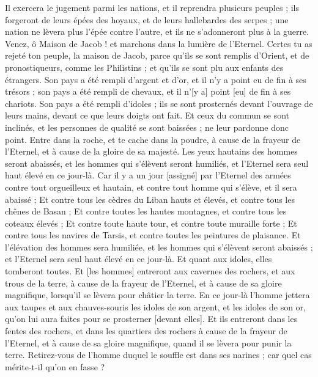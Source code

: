 \begin{multicols}{2}
Il exercera le jugement parmi les nations, et il reprendra plusieurs peuples ; ils forgeront de leurs épées des hoyaux, et de leurs hallebardes des serpes ; une nation ne lèvera plus l'épée contre l'autre, et ils ne s'adonneront plus à la guerre.
Venez, ô Maison de Jacob ! et marchons dans la lumière de l'Eternel.
Certes tu as rejeté ton peuple, la maison de Jacob, parce qu'ils se sont remplis d'Orient, et de pronostiqueurs, comme les Philistins ; et qu'ils se sont plu aux enfants des étrangers.
Son pays a été rempli d'argent et d'or, et il n'y a point eu de fin à ses trésors ; son pays a été rempli de chevaux, et il n'[y a] point [eu] de fin à ses chariots.
Son pays a été rempli d'idoles ; ils se sont prosternés devant l'ouvrage de leurs mains, devant ce que leurs doigts ont fait.
Et ceux du commun se sont inclinés, et les personnes de qualité se sont baissées ; ne leur pardonne donc point.
Entre dans la roche, et te cache dans la poudre, à cause de la frayeur de l'Eternel, et à cause de la gloire de sa majesté.
Les yeux hautains des hommes seront abaissés, et les hommes qui s'élèvent seront humiliés, et l'Eternel sera seul haut élevé en ce jour-là.
Car il y a un jour [assigné] par l'Eternel des armées contre tout orgueilleux et hautain, et contre tout homme qui s'élève, et il sera abaissé ;
Et contre tous les cèdres du Liban hauts et élevés, et contre tous les chênes de Basan ;
Et contre toutes les hautes montagnes, et contre tous les coteaux élevés ;
Et contre toute haute tour, et contre toute muraille forte ;
Et contre tous les navires de Tarsis, et contre toutes les peintures de plaisance.
Et l'élévation des hommes sera humiliée, et les hommes qui s'élèvent seront abaissés ; et l'Eternel sera seul haut élevé en ce jour-là.
Et quant aux idoles, elles tomberont toutes.
Et [les hommes] entreront aux cavernes des rochers, et aux trous de la terre, à cause de la frayeur de l'Eternel, et à cause de sa gloire magnifique, lorsqu'il se lèvera pour châtier la terre.
En ce jour-là l'homme jettera aux taupes et aux chauves-souris les idoles de son argent, et les idoles de son or, qu'on lui aura faites pour se prosterner [devant elles].
Et ils entreront dans les fentes des rochers, et dans les quartiers des rochers à cause de la frayeur de l'Eternel, et à cause de sa gloire magnifique, quand il se lèvera pour punir la terre.
Retirez-vous de l'homme duquel le souffle est dans ses narines ; car quel cas mérite-t-il qu'on en fasse ?

\end{multicols}
